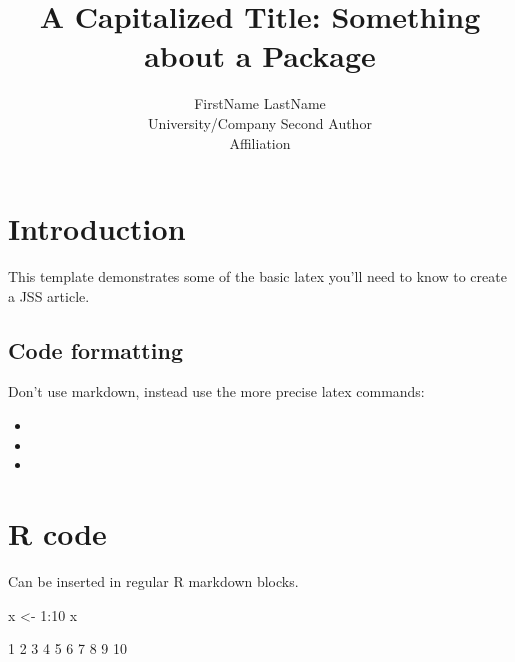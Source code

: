 \documentclass[article]{jss}
\author{
FirstName LastName\\University/Company \And Second Author\\Affiliation
}
\title{A Capitalized Title: Something about a Package \pkg{foo}}
\begin{document}
\section{Introduction}\label{introduction}

This template demonstrates some of the basic latex you'll need to know
to create a JSS article.

\subsection{Code formatting}\label{code-formatting}

Don't use markdown, instead use the more precise latex commands:

\begin{itemize}
\itemsep1pt\parskip0pt
\item
\item
\item
\end{itemize}

\section{R code}\label{r-code}

Can be inserted in regular R markdown blocks.

\begin{CodeChunk}
\begin{CodeInput}
x <- 1:10
x
\end{CodeInput}
\begin{CodeOutput}
 [1]  1  2  3  4  5  6  7  8  9 10
\end{CodeOutput}
\end{CodeChunk}
\end{document}
